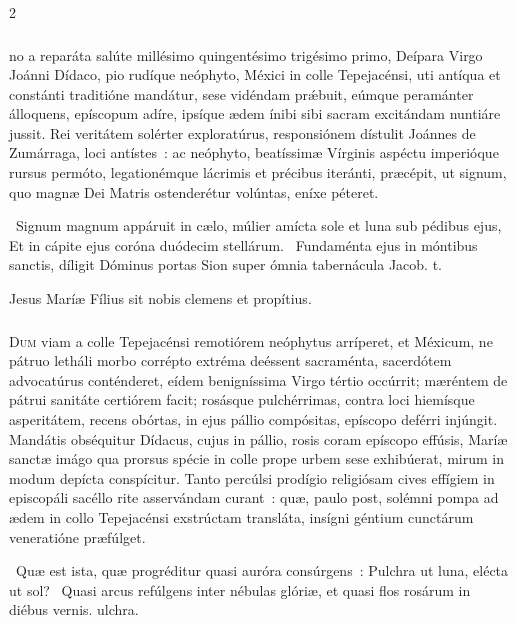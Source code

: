 \documentclass[9pt,twoside]{extarticle}
\begin{document}
\begin{multicols}{2}
\normalsize
\subsubsection*{\center {}}
no a reparáta salúte millésimo quingentésimo trigésimo primo, Deípara Virgo Joánni Dídaco, pio rudíque neóphyto, Méxici in colle Tepejacénsi, uti antíqua et constánti traditióne mandátur, sese vidéndam prǽbuit, eúmque peramánter álloquens, epíscopum adíre, ipsíque ædem ínibi sibi sacram excitándam nuntiáre jussit. Rei veritátem solérter exploratúrus, responsiónem dístulit Joánnes de Zumárraga, loci antístes~: ac neóphyto, beatíssimæ Vírginis aspéctu imperióque rursus permóto, legationémque lácrimis et précibus iteránti, præcépit, ut signum, quo magnæ Dei Matris ostenderétur volúntas, eníxe péteret.

\smallskip
{}~Signum magnum appáruit in cælo, múlier amícta sole et luna sub pédibus ejus, \textred{*} Et in cápite ejus coróna duódecim stellárum.
~Fundaménta ejus in móntibus sanctis, díligit Dóminus portas Sion super ómnia tabernácula Jacob. t.

\medskip
\small {} Jesus Maríæ Fílius sit nobis clemens et propítius.

\normalsize
\subsubsection*{\center {}}
\lettrine{D}{um} viam a colle Tepejacénsi remotiórem neóphytus arríperet, et Méxicum, ne pátruo letháli morbo corrépto extréma deéssent sacraménta, sacerdótem advocatúrus conténderet, eídem benigníssima Virgo tértio occúrrit; mæréntem de pátrui sanitáte certiórem facit; rosásque pulchérrimas, contra loci hiemísque asperitátem, recens obórtas, in ejus pállio compósitas, epíscopo deférri injúngit. Mandátis obséquitur Dídacus, cujus in pállio, rosis coram epíscopo effúsis, Maríæ sanctæ imágo qua prorsus spécie in colle prope urbem sese exhibúerat, mirum in modum depícta conspícitur. Tanto percúlsi prodígio religiósam cives effígiem in episcopáli sacéllo rite asservándam curant~: quæ, paulo post, solémni pompa ad ædem in collo Tepejacénsi exstrúctam transláta, insígni géntium cunctárum veneratióne præfúlget.

\smallskip
{}~Quæ est ista, quæ progréditur quasi auróra consúrgens~: \textred{*} Pulchra ut luna, elécta ut sol?
~Quasi arcus refúlgens inter nébulas glóriæ, et quasi flos rosárum in diébus vernis. ulchra.


\end{multicols}
\end{document}
